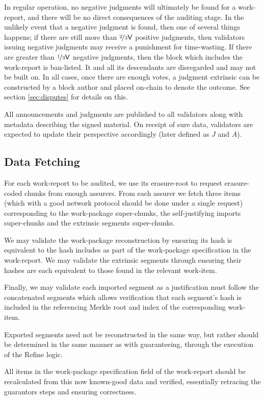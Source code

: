 In regular operation, no negative judgments will ultimately be found for a work-report, and there will be no direct consequences of the auditing stage. In the unlikely event that a negative judgment is found, then one of several things happens; if there are still more than $\nicefrac{2}{3}\mathsf{V}$ positive judgments, then validators issuing negative judgments may receive a punishment for time-wasting. If there are greater than $\nicefrac{1}{3}\mathsf{V}$ negative judgments, then the block which includes the work-report is ban-listed. It and all its descendants are disregarded and may not be built on. In all cases, once there are enough votes, a judgment extrinsic can be constructed by a block author and placed on-chain to denote the outcome. See section \ref{sec:disputes} for details on this.

All announcements and judgments are published to all validators along with metadata describing the signed material. On receipt of sure data, validators are expected to update their perspective accordingly (later defined as $J$ and $A$).

\subsection{Data Fetching}

For each work-report to be audited, we use its erasure-root to request erasure-coded chunks from enough assurers. From each assurer we fetch three items (which with a good network protocol should be done under a single request) corresponding to the work-package super-chunks, the self-justifying imports super-chunks and the extrinsic segments super-chunks.

We may validate the work-package reconstruction by ensuring its hash is equivalent to the hash includes as part of the work-package specification in the work-report. We may validate the extrinsic segments through ensuring their hashes are each equivalent to those found in the relevant work-item.

Finally, we may validate each imported segment as a justification must follow the concatenated segments which allows verification that each segment's hash is included in the referencing Merkle root and index of the corresponding work-item.

Exported segments need not be reconstructed in the same way, but rather should be determined in the same manner as with guaranteeing, \ie through the execution of the Refine logic.

All items in the work-package specification field of the work-report should be recalculated from this now known-good data and verified, essentially retracing the guarantors steps and ensuring correctness.

